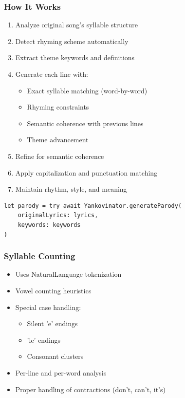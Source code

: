 \documentclass[aspectratio=169]{beamer}
\begin{document}
\begin{frame}[fragile]
\frametitle{How It Works}
\begin{enumerate}
    \item Analyze original song's syllable structure
    \item Detect rhyming scheme automatically
    \item Extract theme keywords and definitions
    \item Generate each line with:
    \begin{itemize}
        \item Exact syllable matching (word-by-word)
        \item Rhyming constraints
        \item Semantic coherence with previous lines
        \item Theme advancement
    \end{itemize}
    \item Refine for semantic coherence
    \item Apply capitalization and punctuation matching
    \item Maintain rhythm, style, and meaning
\end{enumerate}

\begin{lstlisting}
let parody = try await Yankovinator.generateParody(
    originalLyrics: lyrics,
    keywords: keywords
)
\end{lstlisting}
\end{frame}

\begin{frame}
\frametitle{Syllable Counting}
\begin{itemize}
    \item Uses NaturalLanguage tokenization
    \item Vowel counting heuristics
    \item Special case handling:
    \begin{itemize}
        \item Silent 'e' endings
        \item 'le' endings
        \item Consonant clusters
    \end{itemize}
    \item Per-line and per-word analysis
    \item Proper handling of contractions (don't, can't, it's)
\end{itemize}
\end{frame}
\end{document}
